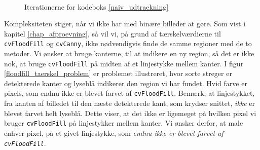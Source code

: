{\begin{figure}[!p]
    \\
    \hspace{1em}
        \caption[]{Iterationerne for kodeboks \ref{naiv_udtraekning}}
    \label{region_extract}
\end{figure}

Kompleksiteten stiger, når vi ikke har med binære billeder at gøre. Som
vist i kapitel \ref{chap_afproevning}, så vil vi, på grund af
tærskelværdierne til \texttt{cvFloodFill} og \texttt{cvCanny}, ikke
nødvendigvis finde de samme regioner med de to metoder. Vi ønsker at
bruge kanterne, til at indikere en ny region, så det er ikke nok, at bruge
\texttt{cvFloodFill} på midten af et linjestykke mellem kanter. I figur
\ref{floodfill_taerskel_problem} er problemet illustreret, hvor sorte
streger er detekterede kanter og lyseblå indikerer den region vi har
fundet. Hvid farve er pixels, som endnu ikke er blevet farvet af
\texttt{cvFloodFill}.  Bemærk, at linjestykket, fra kanten af billedet
til den næste detekterede kant, som krydser snittet, \emph{ikke} er
blevet farvet helt lyseblå. Dette viser, at det ikke er ligemeget på
hvilken pixel vi bruger \texttt{cvFloodFill} på linjestykker mellem
kanter. Vi ønsker derfor, at male enhver pixel, på et givet linjestykke,
som \emph{endnu ikke er blevet farvet af \texttt{cvFloodFill}}.

}
